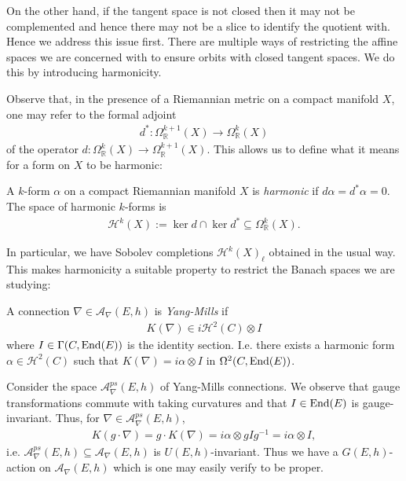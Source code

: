 \documentclass[12pt]{ociamthesis}  %
\begin{document}
On the other hand, if the tangent space is not closed then it may not be complemented and
hence there may not be a slice to identify the quotient with. Hence we address this issue first.
There are multiple ways of restricting the affine spaces we are concerned with to
ensure orbits with closed tangent spaces. We do this by introducing harmonicity.

Observe that, in the presence of a Riemannian metric on a compact
manifold $X$, one may refer to the formal adjoint
\begin{align*}
  d^* : \Omega^{k+1}_{\mathbb{R}}(X)\to \Omega^{k}_{\mathbb{R}}(X)
\end{align*}
of the operator $d : \Omega^k_{\mathbb{R}}(X)\to\Omega^{k+1}_{\mathbb{R}}(X)$. This allows us to
define what it means for a form on $X$ to be harmonic:

\begin{definition}
  A $k$-form $\alpha$ on a compact Riemannian manifold $X$ is \emph{harmonic} if
  $d \alpha = d^* \alpha = 0$. The space of harmonic $k$-forms is
  \begin{align*}
    \mathcal H^k(X) := \ker d \cap \ker d^* \subseteq \Omega^k_{\mathbb{R}}(X).
  \end{align*}
\end{definition}

In particular, we have Sobolev completions $\mathcal H^k(X)_\ell$
obtained in the usual way. This makes harmonicity a suitable property to
restrict the Banach spaces we are studying:

\begin{definition}
  A connection $\nabla\in \mathcal A_\nabla(E,h)$ is \emph{Yang-Mills} if
  \begin{align}\label{eq:yang_mills_condition}
    K(\nabla) \in i\mathcal H^2(C)\otimes I
  \end{align}
  where $I\in\Gamma(C,\operatorname{End}(E))$ is the identity section.
  I.e. there exists a harmonic form $\alpha\in\mathcal H^2(C)$ such
  that $K(\nabla) = i\alpha\otimes I$ in $\Omega^2(C,\operatorname{End}(E))$.
\end{definition}

Consider the space $\mathcal A_\nabla^{ps}(E,h)$ of Yang-Mills connections.
We observe that gauge transformations commute with taking curvatures and
that $I\in\operatorname{End}(E)$ is gauge-invariant. Thus, for $\nabla\in \mathcal A_\nabla^{ps}(E,h)$,
\begin{align*}
  K(g\cdot\nabla)
  = g\cdot K(\nabla)
  = i\alpha\otimes gIg^{-1}
  = i\alpha\otimes I,
\end{align*}
i.e. $\mathcal A_\nabla^{ps}(E,h)\subseteq \mathcal A_\nabla(E,h)$ is $U(E,h)$-invariant.
Thus we have a $G(E,h)$-action on $\mathcal A_\nabla(E,h)$ which is
one may easily verify to be proper.
\end{document}
